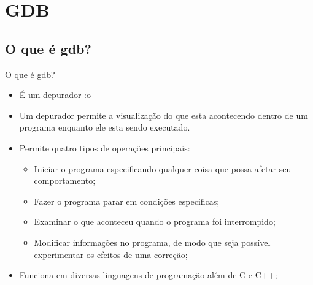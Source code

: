 \section{\scshape GDB}
\frame{\tableofcontents[
    currentsection,
    currentsubsection,
    subsectionstyle=show/shaded/hide
]}

\subsection{ O que é gdb?}
\frame{\tableofcontents[
    currentsection,
    currentsubsection,
    subsectionstyle=show/shaded/hide
]}
\begin{frame}{O que é gdb?}
    \begin{itemize}
        \item É um depurador :o 
        \item Um depurador permite a visualização do que esta acontecendo dentro de um programa enquanto ele esta sendo executado.
        \item Permite quatro tipos de operações principais:
        \begin{itemize}
            \item Iniciar o programa especificando qualquer coisa que possa afetar seu comportamento;
            \item Fazer o programa parar em condições especificas;
            \item Examinar o que aconteceu quando o programa foi interrompido;
            \item Modificar informações no programa, de modo que seja possível experimentar os efeitos de uma correção;
        \end{itemize}
        \item Funciona em diversas linguagens de programação além de C e C++;
    \end{itemize}
\end{frame}

